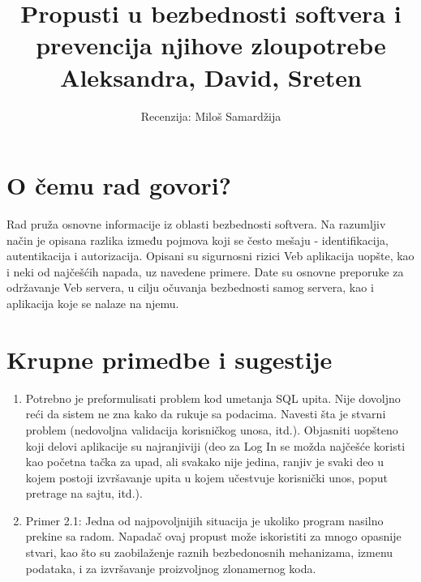 \documentclass[a4paper]{article}
\begin{document}
\title{Propusti u bezbednosti softvera i prevencija njihove zloupotrebe\\ \small{Aleksandra, David, Sreten}}

\author{Recenzija: Miloš Samardžija}


\maketitle




\section{O čemu rad govori?}
Rad pruža osnovne informacije iz oblasti bezbednosti softvera. Na razumljiv način je opisana razlika između pojmova koji se često mešaju - identifikacija, autentikacija i autorizacija. Opisani su sigurnosni rizici Veb aplikacija uopšte, kao i neki od najčešćih napada, uz navedene primere. Date su osnovne preporuke za održavanje Veb servera, u cilju očuvanja bezbednosti samog servera, kao i aplikacija koje se nalaze na njemu.

\section{Krupne primedbe i sugestije}
\begin{enumerate}
	\item Potrebno je preformulisati problem kod umetanja SQL upita. Nije dovoljno reći da sistem ne zna kako da rukuje sa podacima. Navesti šta je stvarni problem (nedovoljna validacija korisničkog unosa, itd.). Objasniti uopšteno koji delovi aplikacije su najranjiviji (deo za Log In se možda najčešće koristi kao početna tačka za upad, ali svakako nije jedina, ranjiv je svaki deo u kojem postoji izvršavanje upita u kojem učestvuje korisnički unos, poput pretrage na sajtu, itd.).
	\item Primer 2.1: Jedna od najpovoljnijih situacija je ukoliko program nasilno prekine sa radom. Napadač ovaj propust može iskoristiti za mnogo opasnije stvari, kao što su zaobilaženje raznih bezbedonosnih mehanizama, izmenu podataka, i za izvršavanje proizvoljnog zlonamernog koda. 
\end{enumerate}
\end{document}
